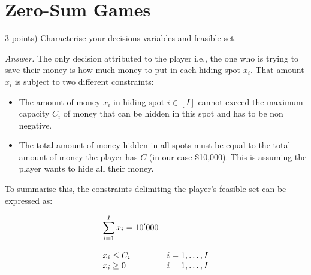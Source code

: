 \documentclass[10pt]{article}
\newenvironment{exercise}[2][Exercise]{\begin{trivlist}
  \item[\hskip \labelsep {\bfseries #1}\hskip \labelsep {\bfseries #2.}]}{\end{trivlist}}
\begin{document}
\section{Zero-Sum Games}
\begin{exercise}{5.1}
(3 points) Characterise your decisions variables and feasible set.

\textit{Answer.}
The only decision attributed to the player i.e., the one who is trying to save their money is how much money to put in each hiding spot $x_i$. That amount $x_i$ is subject to two different constraints:
\begin{itemize}
    \item The amount of money $x_i$ in hiding spot $i\in[I]$ cannot exceed the maximum capacity $C_i$ of money that can be hidden in this spot and has to be non negative.
    \item The total amount of money hidden in all spots must be equal to the total amount of money the player has $C$ (in our case \$10,000). This is assuming the player wants to hide all their money. 
\end{itemize}

To summarise this, the constraints delimiting the player's feasible set can be expressed as:

\begin{equation}\label{eq:owner}
\begin{array}{ll@{}lll}

\displaystyle\sum\limits_{i=1}^{I} x_i = 10'000 \\ \\
x_i \leq C_i && i=1 ,\dots, I\\ 
x_i \geq 0 && i=1 ,\dots, I
\end{array}
\end{equation}
\end{exercise}
\end{document}
